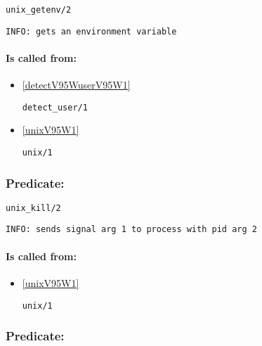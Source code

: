 \begin{verbatim}
unix_getenv/2
\end{verbatim}

{\small \begin{verbatim}
INFO: gets an environment variable

\end{verbatim}}
\paragraph{Is called from:} 
\begin{itemize}
\item \ref{detectV95WuserV95W1} 
\begin{verbatim}
detect_user/1
\end{verbatim}

\item \ref{unixV95W1} 
\begin{verbatim}
unix/1
\end{verbatim}

\end{itemize}

\subsubsection{Predicate:} \label{unixV95WkillV95W2}

\begin{verbatim}
unix_kill/2
\end{verbatim}

{\small \begin{verbatim}
INFO: sends signal arg 1 to process with pid arg 2

\end{verbatim}}
\paragraph{Is called from:} 
\begin{itemize}
\item \ref{unixV95W1} 
\begin{verbatim}
unix/1
\end{verbatim}

\end{itemize}

\subsubsection{Predicate:} \label{unixV95WpidV95W1}

